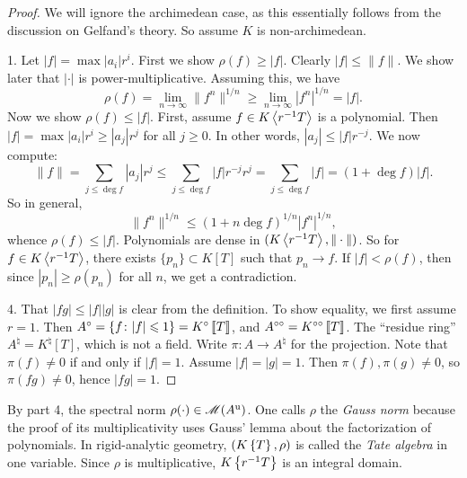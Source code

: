 \begin{proof}
We will ignore the archimedean case, as this essentially follows from the 
discussion on Gelfand's theory. So assume $K$ is non-archimedean.

1. Let $|f|=\max |a_i| r^i$. First we show $\rho(f) \geqslant |f|$. Clearly 
$|f|\leqslant \|f\|$. We show later that $|\cdot|$ is power-multiplicative. 
Assuming this, we have 
\[
  \rho(f) = \lim_{n\to \infty} \|f^n\|^{1/n} \geqslant \lim_{n\to \infty} |f^n|^{1/n} = |f| .
\]
Now we show $\rho(f) \leqslant |f|$. First, assume $f\in K\left\langle r^{-1} T \right\rangle$ is 
a polynomial. Then $|f| = \max |a_i|r^i \geqslant |a_j| r^j$ for all 
$j\geqslant 0$. In other words, $|a_j| \leqslant |f| r^{-j}$. We now compute: 
\[
	\|f\| = \sum_{j\leqslant \deg f} |a_j| r^j \leqslant \sum_{j\leqslant \deg f} |f| r^{-j} r^j = \sum_{j\leqslant \deg f} |f| = (1+\deg f)|f| .
\]
So in general, 
\[
	\|f^n\|^{1/n} \leqslant (1+n\deg f)^{1/n} |f^n|^{1/n} ,
\]
whence $\rho(f) \leqslant |f|$. 
Polynomials are dense in $(K\left\langle r^{-1}T \right\rangle,\|\cdot\|)$. So 
for $f\in K\left\langle r^{-1} T \right\rangle$, there exists $\{p_n\}\subset K[T]$ such that 
$p_n\to f$. If $|f|<\rho(f)$, then since $|p_n|\geqslant \rho(p_n)$ for all 
$n$, we get a contradiction. 

4. That $|f g| \leqslant |f| |g|$ is clear from the definition. To show 
equality, we first assume $r=1$. Then 
$A^\circ = \{f\colon |f|\leqslant 1\} = K^\circ\left\llbracket T\right\rrbracket$, and 
$A^{\circ\circ} = K^{\circ\circ}\left\llbracket T\right\rrbracket$. The ``residue ring'' 
$A^\natural = K^\natural[T]$, which is not a field.  Write 
$\pi\colon A\to A^\natural$ for the projection. Note that 
$\pi(f)\ne 0$ if and only if $|f|=1$. Assume $|f|=|g|=1$. Then 
$\pi(f),\pi(g)\ne 0$, so $\pi(f g)\ne 0$, hence $|f g|=1$. 
\end{proof}

By part 4, the spectral norm $\rho(\cdot)\in \operatorname{\mathscr{M}}(A^\mathrm{u})$. One 
calls $\rho$ the \emph{Gauss norm} because the proof of its multiplicativity 
uses Gauss' lemma about the factorization of polynomials. In rigid-analytic 
geometry, $(K\left\{ T \right\},\rho)$ is called the \emph{Tate algebra} in one 
variable. Since $\rho$ is multiplicative, $K\left\{ r^{-1} T \right\}$ is an 
integral domain. 
